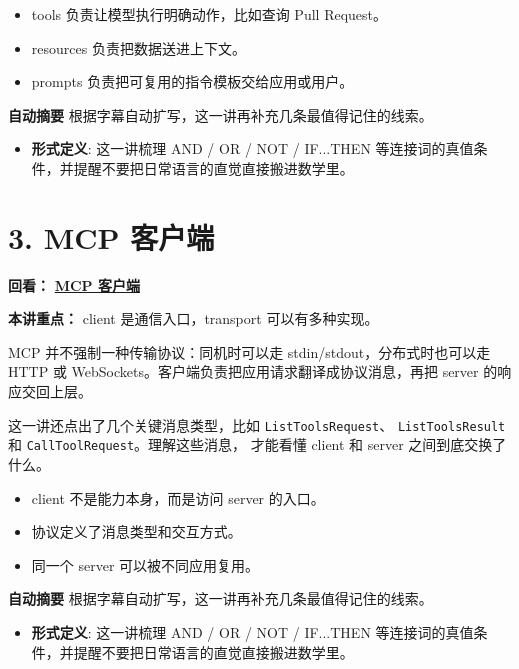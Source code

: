 \documentclass[UTF8,a4paper,11pt]{ctexart}
\newcommand{\videolink}[2]{%
  \href{#1}{\textcolor{videoblue}{\textbf{#2}}}%
}
\begin{document}
\begin{itemize}
  \item tools 负责让模型执行明确动作，比如查询 Pull Request。
  \item resources 负责把数据送进上下文。
  \item prompts 负责把可复用的指令模板交给应用或用户。
\end{itemize}

\begin{keyconcept}
\textbf{自动摘要}
根据字幕自动扩写，这一讲再补充几条最值得记住的线索。
\begin{itemize}
  \item \textbf{形式定义}: 这一讲梳理 AND / OR / NOT / IF...THEN 等连接词的真值条件，并提醒不要把日常语言的直觉直接搬进数学里。
\end{itemize}
\end{keyconcept}

\section*{3. MCP 客户端}
\noindent\textbf{回看：}\videolink{https://www.coursera.org/learn/introduction-to-model-context-protocol/home/module/1}{MCP 客户端}

\textbf{本讲重点：} client 是通信入口，transport 可以有多种实现。

MCP 并不强制一种传输协议：同机时可以走 stdin/stdout，分布式时也可以走 HTTP 或
WebSockets。客户端负责把应用请求翻译成协议消息，再把 server 的响应交回上层。

这一讲还点出了几个关键消息类型，比如 \texttt{ListToolsRequest}、
\texttt{ListToolsResult} 和 \texttt{CallToolRequest}。理解这些消息，
才能看懂 client 和 server 之间到底交换了什么。

\begin{itemize}
  \item client 不是能力本身，而是访问 server 的入口。
  \item 协议定义了消息类型和交互方式。
  \item 同一个 server 可以被不同应用复用。
\end{itemize}

\begin{keyconcept}
\textbf{自动摘要}
根据字幕自动扩写，这一讲再补充几条最值得记住的线索。
\begin{itemize}
  \item \textbf{形式定义}: 这一讲梳理 AND / OR / NOT / IF...THEN 等连接词的真值条件，并提醒不要把日常语言的直觉直接搬进数学里。
\end{itemize}
\end{keyconcept}
\end{document}
